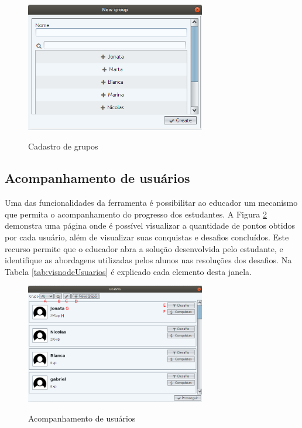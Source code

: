 \documentclass[
	12pt,				%
	oneside,			%
	a4paper,			%
	english,			%
	french,				%
	spanish,			%
	brazil,				%
	]{abntex2}
\begin{document}
\begin{figure}[H]
\centering
\caption{Cadastro de grupos}
\includegraphics[width=0.7\textwidth]{imagens/visnode_novo_grupo.png}
\sourceAuthor
\label{fig:visnodeNovoGrupo}
\end{figure}

\subsection{Acompanhamento de usuários}

Uma das funcionalidades da ferramenta é possibilitar ao educador um mecanismo que permita o acompanhamento do progresso dos estudantes. A Figura \ref{fig:visnodeUsuarios} demonstra uma página onde é possível visualizar a quantidade de pontos obtidos por cada usuário, além de visualizar suas conquistas e desafios concluídos. Este recurso permite que o educador abra a solução desenvolvida pelo estudante, e identifique as abordagens utilizadas pelos alunos nas resoluções dos desafios. Na Tabela \ref{tab:visnodeUsuarios} é explicado cada elemento desta janela.

\begin{figure}[H]
\centering
\caption{Acompanhamento de usuários}
\includegraphics[width=0.7\textwidth]{imagens/visnode_usuarios.png}
\sourceAuthor
\label{fig:visnodeUsuarios}
\end{figure}
\end{document}
